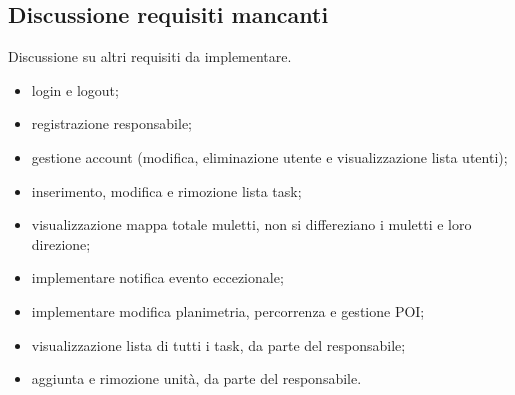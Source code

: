 \subsection{Discussione requisiti mancanti}
Discussione su altri requisiti da implementare.
\begin{itemize}
	\item login e logout;
	\item registrazione responsabile;
	\item gestione account (modifica, eliminazione utente e visualizzazione lista utenti);
	\item inserimento, modifica e rimozione lista task;
	\item visualizzazione mappa totale muletti, non si differeziano i muletti e loro direzione;
	\item implementare notifica evento eccezionale;
	\item implementare modifica planimetria, percorrenza e gestione POI;
	\item visualizzazione lista di tutti i task, da parte del responsabile;
	\item aggiunta e rimozione unità, da parte del responsabile.	
\end{itemize}
